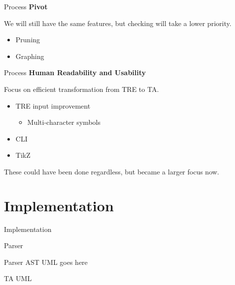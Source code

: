 \documentclass{beamer}
\begin{document}
\begin{frame}{Process}
    \textbf{Pivot}

    We will still have the same features, but checking will take a lower priority.
    \newline
    \begin{itemize}
        \item Pruning
        \item Graphing
    \end{itemize}
\end{frame}

\begin{frame}{Process}
    \textbf{Human Readability and Usability}

    Focus on efficient transformation from TRE to TA.
    \newline
    \begin{itemize}
        \item TRE input improvement
        \begin{itemize}
            \item Multi-character symbols
        \end{itemize}
        \item CLI
        \item TikZ
    \end{itemize}

    These could have been done regardless, but became a larger focus now.
\end{frame}

\section{Implementation}

\begin{frame}{Implementation}
\end{frame}

\begin{frame}[shrink=20]{Parser}
    
\end{frame}

\begin{frame}{Parser}
    AST UML goes here
\end{frame}

\begin{frame}{TA UML}
    
\end{frame}


\end{document}
